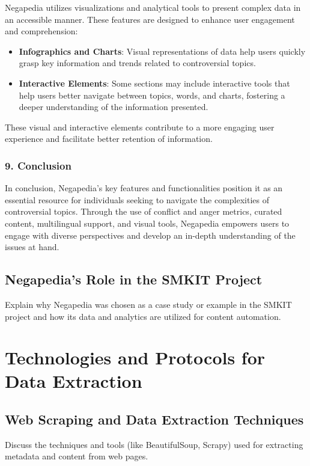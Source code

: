 Negapedia utilizes visualizations and analytical tools to present complex data in an accessible manner. These features are designed to enhance user engagement and comprehension:

\begin{itemize}
    \item \textbf{Infographics and Charts}: Visual representations of data help users quickly grasp key information and trends related to controversial topics.
    \item \textbf{Interactive Elements}: Some sections may include interactive tools that help users better navigate between topics, words, and charts, fostering a deeper understanding of the information presented.
\end{itemize}

These visual and interactive elements contribute to a more engaging user experience and facilitate better retention of information.

\subsubsection{9. Conclusion}

In conclusion, Negapedia’s key features and functionalities position it as an essential resource for individuals seeking to navigate the complexities of controversial topics. Through the use of conflict and anger metrics, curated content, multilingual support, and visual tools, Negapedia empowers users to engage with diverse perspectives and develop an in-depth understanding of the issues at hand.


\subsection{Negapedia's Role in the SMKIT Project}
\label{subsec:negapedia_s_role_in_the_smkit_project}
Explain why Negapedia was chosen as a case study or example in the SMKIT project and how its data and analytics are utilized for content automation.

\section{Technologies and Protocols for Data Extraction}
\label{sec:technologies_and_protocols_for_data_extraction}

\subsection{Web Scraping and Data Extraction Techniques}
\label{subsec:web_scraping_and_data_extraction_techniques}
Discuss the techniques and tools (like BeautifulSoup, Scrapy) used for extracting metadata and content from web pages.


